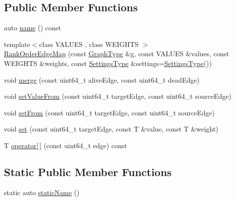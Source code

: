 \subsection*{Public Member Functions}
\begin{DoxyCompactItemize}
\item 
auto \hyperlink{classnifty_1_1graph_1_1agglo_1_1merge__rules_1_1RankOrderEdgeMap_ae1a500cc8f90e57134ad0ab34a4b0425}{name} () const
\item 
{\footnotesize template$<$class V\+A\+L\+U\+ES , class W\+E\+I\+G\+H\+TS $>$ }\\\hyperlink{classnifty_1_1graph_1_1agglo_1_1merge__rules_1_1RankOrderEdgeMap_a971ad0a135c83e57b3649b082f50b2e4}{Rank\+Order\+Edge\+Map} (const \hyperlink{classnifty_1_1graph_1_1agglo_1_1merge__rules_1_1RankOrderEdgeMap_af6ef0c41c3cbeb666e040e06ebcda4c6}{Graph\+Type} \&g, const V\+A\+L\+U\+ES \&values, const W\+E\+I\+G\+H\+TS \&weights, const \hyperlink{classnifty_1_1graph_1_1agglo_1_1merge__rules_1_1RankOrderEdgeMap_a6b6c608fd32fef4275091eba71bb6e1a}{Settings\+Type} \&settings=\hyperlink{classnifty_1_1graph_1_1agglo_1_1merge__rules_1_1RankOrderEdgeMap_a6b6c608fd32fef4275091eba71bb6e1a}{Settings\+Type}())
\item 
void \hyperlink{classnifty_1_1graph_1_1agglo_1_1merge__rules_1_1RankOrderEdgeMap_a6c3273f47e4788c38bb9e884e3ad968a}{merge} (const uint64\+\_\+t alive\+Edge, const uint64\+\_\+t dead\+Edge)
\item 
void \hyperlink{classnifty_1_1graph_1_1agglo_1_1merge__rules_1_1RankOrderEdgeMap_abd93ae043ad33066b05aeea3d8417a30}{set\+Value\+From} (const uint64\+\_\+t target\+Edge, const uint64\+\_\+t source\+Edge)
\item 
void \hyperlink{classnifty_1_1graph_1_1agglo_1_1merge__rules_1_1RankOrderEdgeMap_a4ee972a8bb9154edfbced24b55dd616e}{set\+From} (const uint64\+\_\+t target\+Edge, const uint64\+\_\+t source\+Edge)
\item 
void \hyperlink{classnifty_1_1graph_1_1agglo_1_1merge__rules_1_1RankOrderEdgeMap_a5a6cedd737a0ea813c6efc73929d6c9d}{set} (const uint64\+\_\+t target\+Edge, const T \&value, const T \&weight)
\item 
T \hyperlink{classnifty_1_1graph_1_1agglo_1_1merge__rules_1_1RankOrderEdgeMap_a873bc5fb25d492f74ef3b3dfd08358b8}{operator\mbox{[}$\,$\mbox{]}} (const uint64\+\_\+t edge) const
\end{DoxyCompactItemize}
\subsection*{Static Public Member Functions}
\begin{DoxyCompactItemize}
\item 
static auto \hyperlink{classnifty_1_1graph_1_1agglo_1_1merge__rules_1_1RankOrderEdgeMap_aa13bc5263991b55d9c7a1660dfb33b04}{static\+Name} ()
\end{DoxyCompactItemize}


